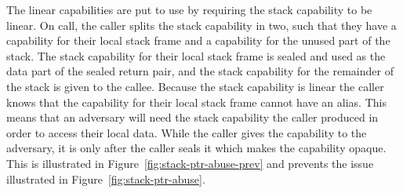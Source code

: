 \documentclass[acmsmall,review,anonymous]{acmart}\settopmatter{printfolios=true,printccs=false,printacmref=false}
\begin{document}
The linear capabilities are put to use by requiring the stack capability to be linear.
On call, the caller splits the stack capability in two, such that they have a capability for their local stack frame and a capability for the unused part of the stack.
The stack capability for their local stack frame is sealed and used as the data part of the sealed return pair, and the stack capability for the remainder of the stack is given to the callee.
Because the stack capability is linear the caller knows that the capability for their local stack frame cannot have an alias.
This means that an adversary will need the stack capability the caller produced in order to access their local data.
While the caller gives the capability to the adversary, it is only after the caller seals it which makes the capability opaque.
This is illustrated in Figure~\ref{fig:stack-ptr-abuse-prev} and prevents the issue illustrated in Figure~\ref{fig:stack-ptr-abuse}.
\end{document}
